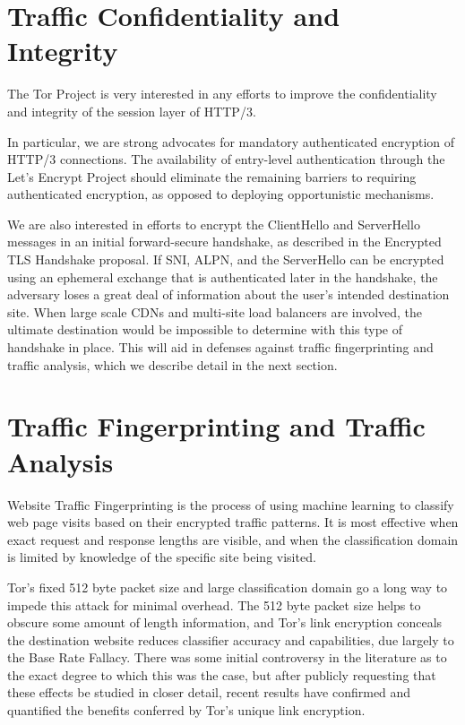 \documentclass[letterpaper,11pt]{llncs}
\begin{document}
\section{Traffic Confidentiality and Integrity}

The Tor Project is very interested in any efforts to improve the
confidentiality and integrity of the session layer of HTTP/3. 

In particular, we are strong advocates for mandatory authenticated encryption
of HTTP/3 connections.  The availability of entry-level authentication through
the Let's Encrypt Project should eliminate the remaining barriers to requiring
authenticated encryption, as opposed to deploying opportunistic mechanisms.

We are also interested in efforts to encrypt the ClientHello and ServerHello
messages in an initial forward-secure handshake, as described in the Encrypted
TLS Handshake proposal. If SNI, ALPN, and the ServerHello can be encrypted
using an ephemeral exchange that is authenticated later in the handshake,
the adversary loses a great deal of information about the user's intended
destination site. When large scale CDNs and multi-site load balancers are
involved, the ultimate destination would be impossible to determine with this
type of handshake in place. This will aid in defenses against traffic
fingerprinting and traffic analysis, which we describe detail in the next
section.


\section{Traffic Fingerprinting and Traffic Analysis}

Website Traffic Fingerprinting is the process of using machine learning to
classify web page visits based on their encrypted traffic patterns. It is most
effective when exact request and response lengths are visible, and when the
classification domain is limited by knowledge of the specific site being
visited.

Tor's fixed 512 byte packet size and large classification domain go a long way
to impede this attack for minimal overhead. The 512 byte packet size helps to
obscure some amount of length information, and Tor's link encryption conceals
the destination website reduces classifier accuracy and capabilities, due
largely to the Base Rate Fallacy. There was some initial controversy in the
literature as to the exact degree to which this was the case, but after
publicly requesting that these effects be studied in closer detail, recent
results have confirmed and quantified the benefits conferred by Tor's unique
link encryption.
\end{document}
